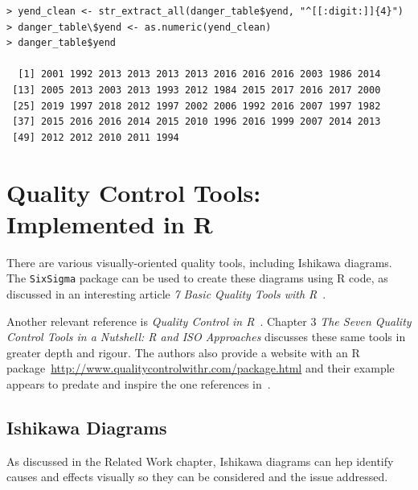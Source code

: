 \begin{lstlisting}[caption=Parsing dates from Wikipedia content,label=listing:parse_dates]
> yend_clean <- str_extract_all(danger_table$yend, "^[[:digit:]]{4}")
> danger_table\$yend <- as.numeric(yend_clean)
> danger_table$yend

  [1] 2001 1992 2013 2013 2013 2013 2016 2016 2016 2003 1986 2014
 [13] 2005 2013 2003 2013 1993 2012 1984 2015 2017 2016 2017 2000 
 [25] 2019 1997 2018 2012 1997 2002 2006 1992 2016 2007 1997 1982
 [37] 2015 2016 2016 2014 2015 2010 1996 2016 1999 2007 2014 2013
 [49] 2012 2012 2010 2011 1994
\end{lstlisting}

\section{Quality Control Tools: Implemented in R}
There are various visually-oriented quality tools, including Ishikawa diagrams. The \texttt{SixSigma} package can be used to create these diagrams using R code, as discussed in an interesting article \emph{7 Basic Quality Tools with R}~\cite{7_basic_quality_tools_with_R}.

Another relevant reference is \emph{Quality Control in R}~\cite{quality_control_in_R_book}. Chapter 3 \emph{The Seven Quality Control Tools in a Nutshell: R and ISO Approaches} discusses these same tools in greater depth and rigour. The authors also provide a website with an R package~\url{http://www.qualitycontrolwithr.com/package.html} and their example appears to predate and inspire the one references in~\cite{7_basic_quality_tools_with_R}.

\subsection{Ishikawa Diagrams}
As discussed in the Related Work chapter, Ishikawa diagrams can hep identify causes and effects visually so they can be considered and the issue addressed.

